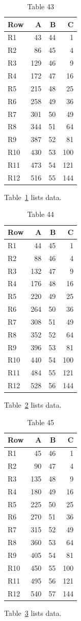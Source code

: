 \documentclass[10pt]{article}
\begin{document}
\begin{table}[ht]\centering\caption{Table 43}\label{tab:43}\begin{tabular}{lrrr}\toprule Row&A&B&C\\\midrule
R1&43&44&1\\
R2&86&45&4\\
R3&129&46&9\\
R4&172&47&16\\
R5&215&48&25\\
R6&258&49&36\\
R7&301&50&49\\
R8&344&51&64\\
R9&387&52&81\\
R10&430&53&100\\
R11&473&54&121\\
R12&516&55&144\\
\bottomrule\end{tabular}\end{table} Table~\ref{tab:43} lists data.
\begin{table}[ht]\centering\caption{Table 44}\label{tab:44}\begin{tabular}{lrrr}\toprule Row&A&B&C\\\midrule
R1&44&45&1\\
R2&88&46&4\\
R3&132&47&9\\
R4&176&48&16\\
R5&220&49&25\\
R6&264&50&36\\
R7&308&51&49\\
R8&352&52&64\\
R9&396&53&81\\
R10&440&54&100\\
R11&484&55&121\\
R12&528&56&144\\
\bottomrule\end{tabular}\end{table} Table~\ref{tab:44} lists data.
\begin{table}[ht]\centering\caption{Table 45}\label{tab:45}\begin{tabular}{lrrr}\toprule Row&A&B&C\\\midrule
R1&45&46&1\\
R2&90&47&4\\
R3&135&48&9\\
R4&180&49&16\\
R5&225&50&25\\
R6&270&51&36\\
R7&315&52&49\\
R8&360&53&64\\
R9&405&54&81\\
R10&450&55&100\\
R11&495&56&121\\
R12&540&57&144\\
\bottomrule\end{tabular}\end{table} Table~\ref{tab:45} lists data.
\end{document}
